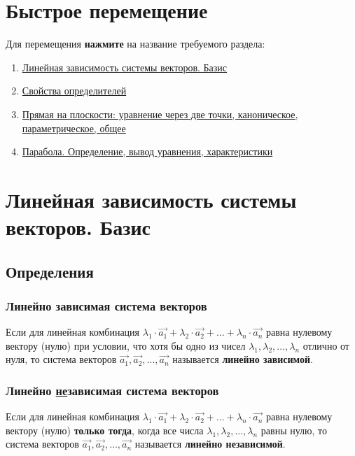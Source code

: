 \documentclass[12pt, fleqn]{extarticle}
\begin{document}
\section*{Быстрое перемещение}

Для перемещения \textbf{нажмите} на название требуемого раздела:
\begin{enumerate}
    \item \hyperref[sec:linear-dependence]{Линейная зависимость системы векторов. Базис}
    \item \hyperref[sec:det]{Свойства определителей}
    \item \hyperref[sec:line]{Прямая на плоскости: уравнение через две точки, каноническое, параметрическое, общее}
    \item \hyperref[sec:parabola]{Парабола. Определение, вывод уравнения, характеристики}
\end{enumerate}

\newpage

\section*{Линейная зависимость системы векторов. Базис}\label{sec:linear-dependence}

\subsection*{Определения}

\subsubsection*{Линейно зависимая система векторов}
Если для линейная комбинация \(\lambda_1 \cdot \overrightarrow{a_1} + \lambda_2 \cdot \overrightarrow{a_2} + ... + \lambda_n \cdot \overrightarrow{a_n}\) равна нулевому вектору (нулю) при условии, что хотя бы одно из чисел \(\lambda_1, \lambda_2, ..., \lambda_n\) отлично от нуля, то система векторов \(\overrightarrow{a_1}, \overrightarrow{a_2}, ..., \overrightarrow{a_n}\) называется \textbf{линейно зависимой}.

\subsubsection*{Линейно \underline{не}зависимая система векторов}
Если для линейная комбинация \(\lambda_1 \cdot \overrightarrow{a_1} + \lambda_2 \cdot \overrightarrow{a_2} + ... + \lambda_n \cdot \overrightarrow{a_n}\) равна нулевому вектору (нулю) \textbf{только тогда}, когда все числа \(\lambda_1, \lambda_2, ..., \lambda_n\) равны нулю, то система векторов \(\overrightarrow{a_1}, \overrightarrow{a_2}, ..., \overrightarrow{a_n}\) называется \textbf{линейно независимой}.
\end{document}
